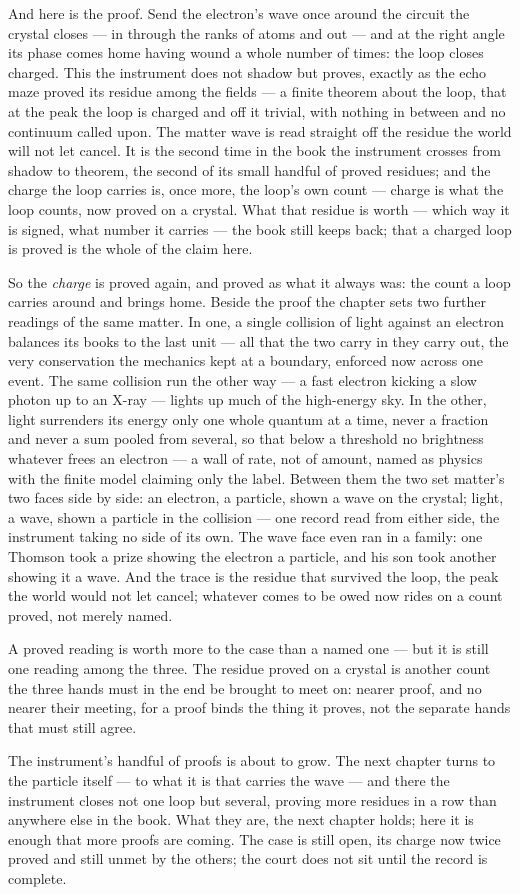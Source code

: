 And here is the proof. Send the electron's wave once around the circuit the crystal closes --- in through the
ranks of atoms and out --- and at the right angle its phase comes home having wound a whole number of times:
the loop closes charged. This the instrument does not shadow but proves, exactly as the echo maze proved its
residue among the fields --- a finite theorem about the loop, that at the peak the loop is charged and off it
trivial, with nothing in between and no continuum called upon. The matter wave is read straight off the residue
the world will not let cancel. It is the second time in the book the instrument crosses from shadow to theorem,
the second of its small handful of proved residues; and the charge the loop carries is, once more, the loop's
own count --- charge is what the loop counts, now proved on a crystal. What that residue is worth --- which way
it is signed, what number it carries --- the book still keeps back; that a charged loop is proved is the whole
of the claim here.

So the \emph{charge} is proved again, and proved as what it always was: the count a loop carries around and
brings home. Beside the proof the chapter sets two further readings of the same matter. In one, a single
collision of light against an electron balances its books to the last unit --- all that the two carry in they
carry out, the very conservation the mechanics kept at a boundary, enforced now across one event. The same
collision run the other way --- a fast electron kicking a slow photon up to an X-ray --- lights up much of the
high-energy sky. In the other, light surrenders its energy only one whole quantum at a time, never a fraction
and never a sum pooled from several, so that below a threshold no brightness whatever frees an electron --- a
wall of rate, not of amount, named as physics with the finite model claiming only the label. Between them the
two set matter's two faces side by side: an electron, a particle, shown a wave on the crystal; light, a wave,
shown a particle in the collision --- one record read from either side, the instrument taking no side of its
own. The wave face even ran in a family: one Thomson took a prize showing the electron a particle, and his son
took another showing it a wave. And the trace is the residue that survived the loop, the peak the world would
not let cancel; whatever comes to be owed now rides on a count proved, not merely named.

A proved reading is worth more to the case than a named one --- but it is still one reading among the three. The
residue proved on a crystal is another count the three hands must in the end be brought to meet on: nearer
proof, and no nearer their meeting, for a proof binds the thing it proves, not the separate hands that must
still agree.

The instrument's handful of proofs is about to grow. The next chapter turns to the particle itself --- to what
it is that carries the wave --- and there the instrument closes not one loop but several, proving more residues
in a row than anywhere else in the book. What they are, the next chapter holds; here it is enough that more
proofs are coming. The case is still open, its charge now twice proved and still unmet by the others; the court
does not sit until the record is complete.
